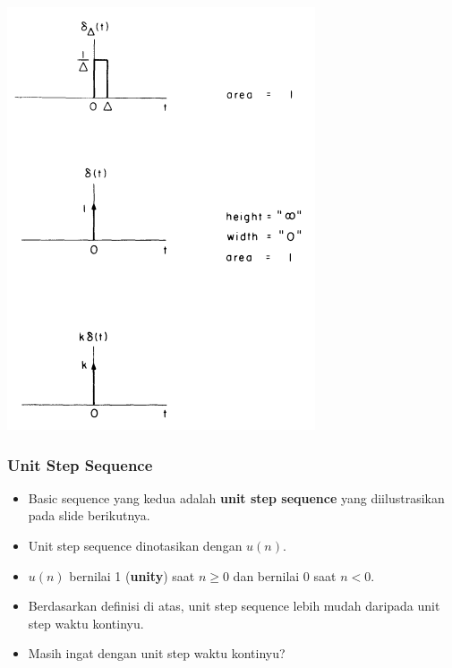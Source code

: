 \documentclass[pdflatex,compress]{beamer}
\begin{document}
\begin{frame}
\begin{multicols}{2}
\begin{center}
			\includegraphics[width=0.9\linewidth]{img/img005}
		\end{center}
	\end{multicols}
\end{frame}

\begin{frame}
	\frametitle{Unit Step Sequence}
	\begin{itemize}
		\item Basic sequence yang kedua adalah \textbf{unit step sequence} yang diilustrasikan pada slide berikutnya.
		\item Unit step sequence dinotasikan dengan $ u(n) $.
		\item $ u(n) $ bernilai 1 (\textbf{unity}) saat $ n \geq 0 $ dan bernilai 0 saat $ n < 0 $.
		\item Berdasarkan definisi di atas, unit step sequence lebih mudah daripada unit step waktu kontinyu.
		\item Masih ingat dengan unit step waktu kontinyu?
	\end{itemize}
\end{frame}
\end{document}
